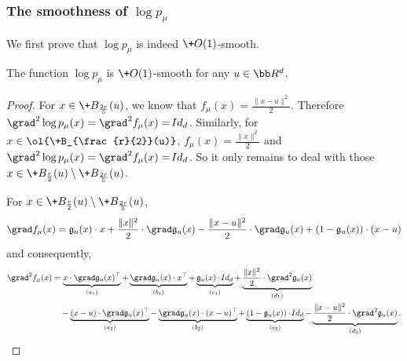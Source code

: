 \subsubsection{The smoothness of $\log p_{\mu}$}\label{subsec:stitched1}

We first prove that $\log p_{\mu}$ is indeed $\+O(1)$-smooth.

\begin{lemma}\label{lem:stitchsmooth}
    The function $\log p_{\mu}$ is $\+O(1)$-smooth for any $u\in \bb R^d$.
\end{lemma}
\begin{proof}
    For $x\in \+B_{\frac{2r}{5}}(u)$, we know that $f_{\mu}(x) = \frac{\|x-u\|^2}{2}$. Therefore $\grad^2 \log p_{\mu}(x) = \grad^2 f_{\mu}(x) = \!{Id}_d$. Similarly, for $x\in \ol{\+B_{\frac{r}{2}}(u)}$, $f_{\mu}(x)=\frac{\|x\|^2}{2}$ and $\grad^2 \log p_{\mu}(x) = \grad^2 f_{\mu}(x) = \!{Id}_d$. So it only remains to deal with those $x\in \+B_{\frac{r}{2}}(u) \setminus \+B_{\frac{2r}{5}}(u)$.

    For $x\in \+B_{\frac{r}{2}}(u)\setminus \+B_{\frac{2r}{5}}(u)$, 
    \begin{align*}
        \grad f_{\mu}(x) = \mathfrak{g}_{u}(x)\cdot x + \frac{\|x\|^2}{2} \cdot \grad \mathfrak{g}_{u}(x) - \frac{\|x - u\|^2}{2}\cdot \grad \mathfrak{g}_{u}(x)+ (1-\mathfrak{g}_{u}(x))\cdot (x-u)
    \end{align*}
    and consequently,
    \begin{align}
        \grad^2 f_{\mu}(x) &= \underbrace{x\cdot \grad \mathfrak{g}_{u}(x)^{\top}}_{(a_1)} + \underbrace{\grad \mathfrak{g}_{u}(x)\cdot  x^{\top}}_{(b_1)} + \underbrace{\mathfrak{g}_{u}(x)\cdot \!{Id}_d}_{(c_1)} + \underbrace{\frac{\|x\|^2}{2}\cdot \grad^2 \mathfrak{g}_{u}(x)}_{(d_1)} \notag \\
        &\quad - \underbrace{(x-u)\cdot \grad \mathfrak{g}_{u}(x)^{\top}}_{(a_2)} - \underbrace{\grad \mathfrak{g}_{u}(x)\cdot (x-u)^{\top}}_{(b_2)} + \underbrace{(1-\mathfrak{g}_{u}(x))\cdot \!{Id}_d}_{(c_2)} -\underbrace{\frac{\|x - u\|^2}{2}\cdot \grad^2 \mathfrak{g}_{u}(x)}_{(d_2)}. \label{eq:1}
    \end{align}


\end{proof}
